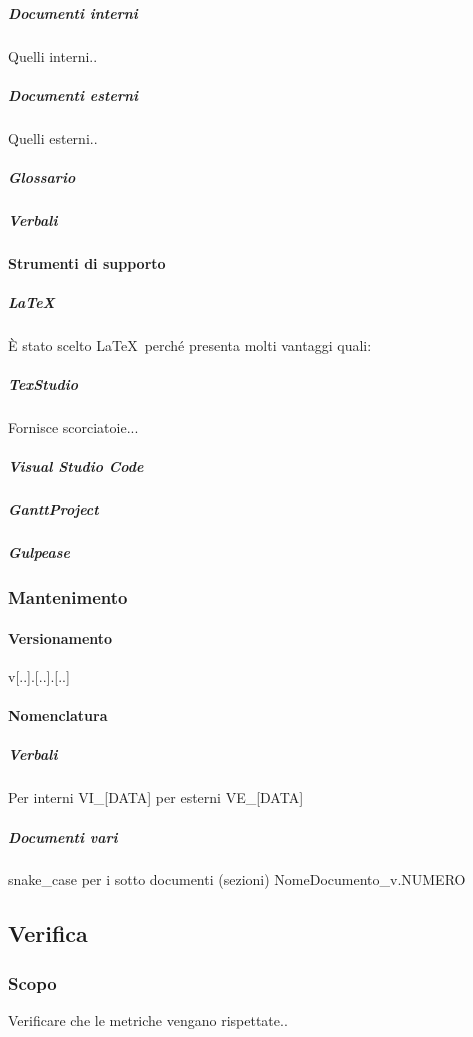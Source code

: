 			\subparagraph{Documenti interni}
			Quelli interni..

			\subparagraph{Documenti esterni}
			Quelli esterni..

			\subparagraph{Glossario}

			\subparagraph{Verbali}



			\paragraph{Strumenti di supporto}

			\subparagraph{\LaTeX} \label{LaTeX}
			È stato scelto \LaTeX \ perché presenta molti vantaggi quali:

			\subparagraph{TexStudio}
			Fornisce scorciatoie...
			
			\subparagraph{Visual Studio Code}
			

			\subparagraph{GanttProject}
			
			
			\subparagraph{Gulpease}
			
			

		\subsubsection{Mantenimento}

			\paragraph{Versionamento}
			v[..].[..].[..]

			\paragraph{Nomenclatura}

			\subparagraph{Verbali}
			Per interni		VI\_[DATA]
			per esterni		VE\_[DATA]

			\subparagraph{Documenti vari}
			snake\_case per i sotto documenti (sezioni)
			NomeDocumento\_v.NUMERO

	\subsection{Verifica}

		\subsubsection{Scopo}
		Verificare che le metriche vengano rispettate..

